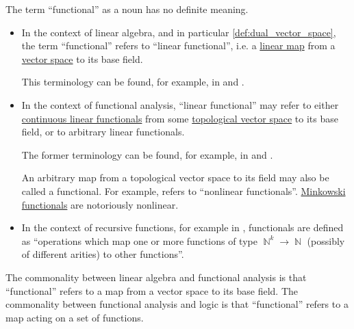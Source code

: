 \begin{concept}\label{con:functional}
  The term \enquote{functional} as a noun has no definite meaning.

  \begin{itemize}
    \item In the context of linear algebra, and in particular \cref{def:dual_vector_space}, the term \enquote{functional} refers to \enquote{linear functional}, i.e. a \hyperref[def:linear_function]{linear map} from a \hyperref[def:vector_space]{vector space} to its base field.

    This terminology can be found, for example, in \cite[50]{Knapp2016BasicAlgebra} and \cite[sec. 26.1]{Тыртышников2007ЛинейнаяАлгебра}.

    \item In the context of functional analysis, \enquote{linear functional} may refer to either \hyperref[def:continuous_dual_space]{continuous linear functionals} from some \hyperref[def:topological_vector_space]{topological vector space} to its base field, or to arbitrary linear functionals.

    The former terminology can be found, for example, in \cite[def. 3.1]{Rudin1991FunctionalAnalysis} and \cite[sec. 1.3]{Clarke2013OptimalControl}.

    An arbitrary map from a topological vector space to its field may also be called a functional. For example, \cite[223]{Deimling1985NonlinearFA} refers to \enquote{nonlinear functionals}. \hyperref[def:minkowski_functional]{Minkowski functionals} are notoriously nonlinear.

    \item In the context of recursive functions, for example in \cite{StanfordPlato:recursive_functions}, functionals are defined as \enquote{operations which map one or more functions of type \( \BbbN^k \to \BbbN \) (possibly of different arities) to other functions}.
  \end{itemize}

  The commonality between linear algebra and functional analysis is that \enquote{functional} refers to a map from a vector space to its base field. The commonality between functional analysis and logic is that \enquote{functional} refers to a map acting on a set of functions.
\end{concept}

